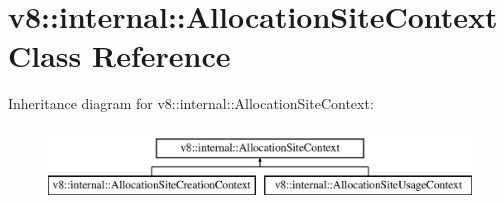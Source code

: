 \hypertarget{classv8_1_1internal_1_1_allocation_site_context}{}\section{v8\+:\+:internal\+:\+:Allocation\+Site\+Context Class Reference}
\label{classv8_1_1internal_1_1_allocation_site_context}
Inheritance diagram for v8\+:\+:internal\+:\+:Allocation\+Site\+Context\+:\begin{figure}[H]
\begin{center}
\leavevmode
\includegraphics[height=2.000000cm]{classv8_1_1internal_1_1_allocation_site_context}
\end{center}
\end{figure}
